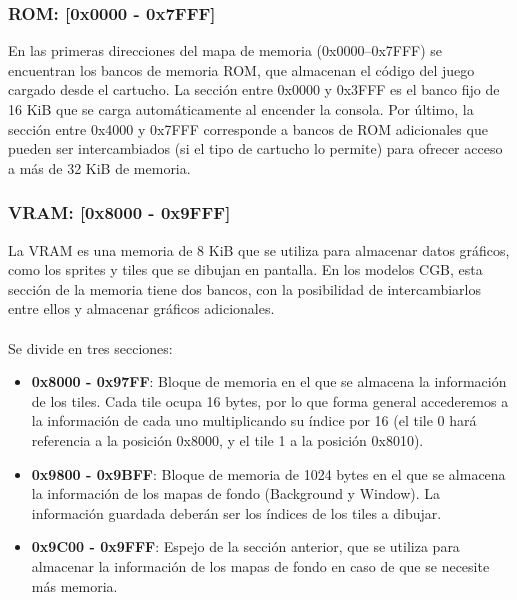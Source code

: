 \subsubsection{ROM: [0x0000 - 0x7FFF]}
En las primeras direcciones del mapa de memoria (0x0000–0x7FFF) se encuentran los bancos de memoria ROM, que almacenan el código del juego cargado desde el cartucho. La sección entre 0x0000 y 0x3FFF es el banco fijo de 16 KiB que se carga automáticamente al encender la consola. Por último, la sección entre 0x4000 y 0x7FFF corresponde a bancos de ROM adicionales que pueden ser intercambiados (si el tipo de cartucho lo permite) para ofrecer acceso a más de 32 KiB de memoria.

\subsubsection{VRAM: [0x8000 - 0x9FFF]}\label{mem:vram}
La VRAM es una memoria de 8 KiB que se utiliza para almacenar datos gráficos, como los sprites y tiles que se dibujan en pantalla. En los modelos CGB, esta sección de la memoria tiene dos bancos, con la posibilidad de intercambiarlos entre ellos y almacenar gráficos adicionales.
\\\\
Se divide en tres secciones:
\begin{itemize}
    \item \label{mem:vram_1} \textbf{0x8000 - 0x97FF}: Bloque de memoria en el que se almacena la información de los tiles. Cada tile ocupa 16 bytes, por lo que forma general accederemos a la información de cada uno multiplicando su índice por 16 (el tile 0 hará referencia a la posición 0x8000, y el tile 1 a la posición 0x8010).
    \item \textbf{0x9800 - 0x9BFF}: Bloque de memoria de 1024 bytes en el que se almacena la información de los mapas de fondo (Background y Window). La información guardada deberán ser los índices de los tiles a dibujar.
    \item \textbf{0x9C00 - 0x9FFF}: Espejo de la sección anterior, que se utiliza para almacenar la información de los mapas de fondo en caso de que se necesite más memoria.
\end{itemize}

